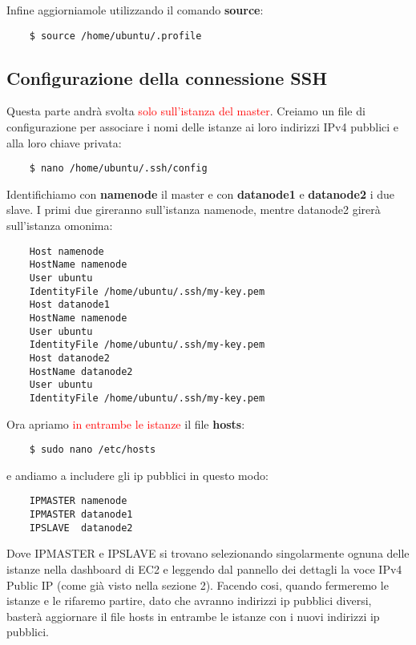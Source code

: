 Infine aggiorniamole utilizzando il comando \textbf{source}:

\begin{verbatim}
    $ source /home/ubuntu/.profile
\end{verbatim}


\newpage


\subsection{Configurazione della connessione SSH}

Questa parte andrà svolta \textcolor{red}{solo sull'istanza del master}. Creiamo un file di configurazione per associare i nomi delle istanze ai loro indirizzi IPv4 pubblici e alla loro chiave privata:

\begin{verbatim}
    $ nano /home/ubuntu/.ssh/config
\end{verbatim}

Identifichiamo con \textbf{namenode} il master e con \textbf{datanode1} e \textbf{datanode2} i due slave. I primi due gireranno sull'istanza namenode, mentre datanode2 girerà sull'istanza omonima:

\begin{verbatim}
    Host namenode
    HostName namenode
    User ubuntu
    IdentityFile /home/ubuntu/.ssh/my-key.pem
    Host datanode1
    HostName namenode
    User ubuntu
    IdentityFile /home/ubuntu/.ssh/my-key.pem
    Host datanode2
    HostName datanode2
    User ubuntu
    IdentityFile /home/ubuntu/.ssh/my-key.pem
\end{verbatim}

Ora apriamo \textcolor{red}{in entrambe le istanze} il file \textbf{hosts}:

\begin{verbatim}
    $ sudo nano /etc/hosts
\end{verbatim}

e andiamo a includere gli ip pubblici in questo modo:

\begin{verbatim}
    IPMASTER namenode
    IPMASTER datanode1
    IPSLAVE  datanode2
\end{verbatim}

Dove IPMASTER e IPSLAVE si trovano selezionando singolarmente ognuna delle istanze nella dashboard di EC2 e leggendo dal pannello dei dettagli la voce IPv4 Public IP (come già visto nella sezione 2). Facendo cosi, quando fermeremo le istanze e le rifaremo partire, dato che avranno indirizzi ip pubblici diversi, basterà aggiornare il file hosts in entrambe le istanze con i nuovi indirizzi ip pubblici.

